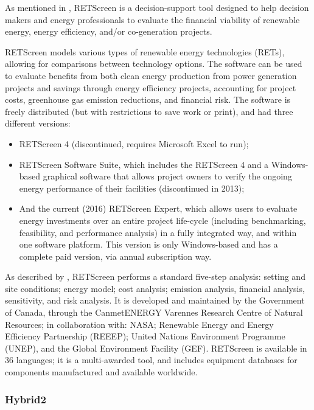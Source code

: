 As mentioned in \cite{Pradhan}, RETScreen is a decision-support tool designed to help decision makers and energy professionals to evaluate the financial viability of renewable energy, energy efficiency, and/or co-generation projects.

RETScreen models various types of renewable energy technologies (RETs), allowing for comparisons between technology options. The software can be used to evaluate benefits from both clean energy production from power generation projects and savings through energy efficiency projects, accounting for project costs, greenhouse gas emission reductions, and financial risk. The software is freely distributed (but with restrictions to save work or print), and had three different versions:

\begin{itemize}
\item RETScreen 4 (discontinued, requires Microsoft Excel to run); 
\item RETScreen Software Suite, which includes the RETScreen 4 and a Windows-based graphical software that allows project owners to verify the ongoing energy performance of their facilities (discontinued in 2013);
\item And the current (2016) RETScreen Expert, which allows users to evaluate energy investments over an entire project life-cycle (including benchmarking, feasibility, and performance analysis) in a fully integrated way, and within one software platform. This version is only Windows-based and has a complete paid version, via annual subscription way.
\end{itemize}

As described by \cite{Pradhan}, RETScreen performs a standard five-step analysis: setting and site conditions; energy model; cost analysis; emission analysis, financial analysis, sensitivity, and risk analysis. It is developed and maintained by the Government of Canada, through the CanmetENERGY Varennes Research Centre of Natural Resources; in collaboration with: NASA; Renewable Energy and Energy Efficiency Partnership (REEEP); United Nations Environment Programme (UNEP), and the Global Environment Facility (GEF). RETScreen is available in 36 languages; it is a multi-awarded tool, and includes equipment databases for components manufactured and available worldwide.

\subsubsection{Hybrid2}


